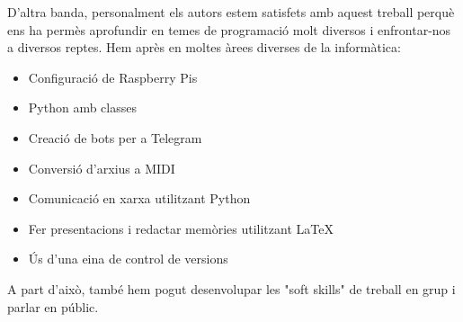 \documentclass[a4paper]{paper}
\begin{document}
D'altra banda, personalment els autors estem satisfets amb aquest treball perquè ens ha permès aprofundir en temes de programació molt diversos i enfrontar-nos a diversos reptes. Hem après en moltes àrees diverses de la informàtica:

\begin{itemize}
	\item Configuració de Raspberry Pis
	\item Python amb classes
	\item Creació de bots per a Telegram
	\item Conversió d'arxius a MIDI
	\item Comunicació en xarxa utilitzant Python
	\item Fer presentacions i redactar memòries utilitzant \LaTeX
	\item Ús d'una eina de control de versions
\end{itemize}

A part d'això, també hem pogut desenvolupar les "soft skills" de treball en grup i parlar en públic.


\printbibliography
\end{document}
